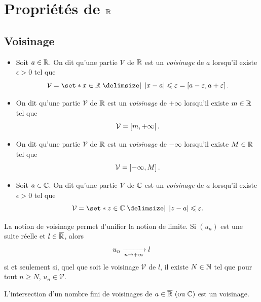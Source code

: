\documentclass{magnoliaold}
\begin{document}



\section{Propriétés de $\mathbb{R}$}

\subsection{Voisinage}

\begin{definition}[utile=-3]
\begin{itemize}
\item Soit $a\in\mathbb{R}$. On dit qu'une partie $\mathcal{V}$ de $\mathbb{R}$ est un \emph{voisinage} de $a$ lorsqu'il existe $\epsilon>0$ tel que 
  \[\mathcal{V}=\enstq{x\in\R}{\abs{x-a}\leq\epsilon} 
    =\interf{a-\epsilon}{a+\epsilon}.\]
\item On dit qu'une partie $\mathcal{V}$ de $\mathbb{R}$ est un \emph{voisinage} de $+\infty$
  lorsqu'il existe $m\in\mathbb{R}$ tel que
  \[\mathcal{V}=\left[m,+\infty\right[.\]
\item On dit qu'une partie $\mathcal{V}$ de $\mathbb{R}$ est un \emph{voisinage} de $-\infty$
  lorsqu'il existe $M\in\mathbb{R}$ tel que
  \[\mathcal{V}=\left]-\infty,M\right].\]
\item Soit $a\in\mathbb{C}$. On dit qu'une partie $\mathcal{V}$ de $\mathbb{C}$ est un \emph{voisinage} de $a$ lorsqu'il existe $\epsilon>0$ tel que
  \[\mathcal{V}=\enstq{z\in\C}{\abs{z-a}\leq\epsilon}.\]
\end{itemize}
\end{definition}

\begin{remarqueUnique}
\remarque La notion de voisinage permet d'unifier la notion de limite. Si $(u_n)$ est
  une suite réelle et $l\in\overline{\mathbb{R}}$, alors
  \[u_n\xrightarrow[n\rightarrow +\infty]{}l\]
  si et seulement si, quel que soit le voisinage $\mathcal{V}$ de $l$, il
  existe $N\in\mathbb{N}$ tel que pour tout $n\geq N$, $u_n\in\mathcal{V}$.
\end{remarqueUnique}

\begin{proposition}
L'intersection d'un nombre fini de voisinages de $a\in\text{$\overline{\mathbb{R}}$ (ou $\mathbb{C}$)}$ est un voisinage.
\end{proposition}
\end{document}
